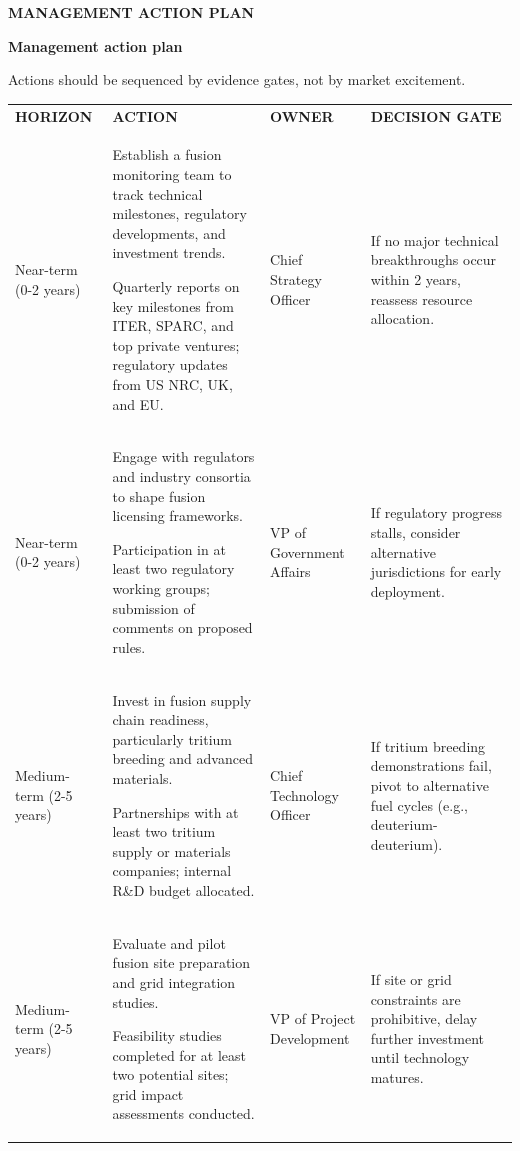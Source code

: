 \documentclass[10pt,a4paper]{article}
\begin{document}
\clearpage
{\textcolor{BOBlue}{\scriptsize\bfseries MANAGEMENT ACTION PLAN}}\par\vspace{-1pt}
{\Large\sffamily\bfseries\color{BONavy} Management action plan}\par\vspace{4pt}
{\small\color{BOMuted} Actions should be sequenced by evidence gates, not by market excitement.}\par\vspace{4pt}
\vspace{2pt}{\color{BOBright}\rule{\linewidth}{1pt}}\vspace{5pt}
\begin{tabularx}{\linewidth}{p{24mm}Yp{25mm}Y}
{\scriptsize\bfseries\color{BOBlue} HORIZON} & {\scriptsize\bfseries\color{BOBlue} ACTION} & {\scriptsize\bfseries\color{BOBlue} OWNER} & {\scriptsize\bfseries\color{BOBlue} DECISION GATE} \\[3pt]
{\scriptsize Near-term (0-2 years)} & {\scriptsize Establish a fusion monitoring team to track technical milestones, regulatory developments, and investment trends.\par\textcolor{BOMuted}{Quarterly reports on key milestones from ITER, SPARC, and top private ventures; regulatory updates from US NRC, UK, and EU.}} & {\scriptsize Chief Strategy Officer} & {\scriptsize If no major technical breakthroughs occur within 2 years, reassess resource allocation.} \\[6pt]
{\scriptsize Near-term (0-2 years)} & {\scriptsize Engage with regulators and industry consortia to shape fusion licensing frameworks.\par\textcolor{BOMuted}{Participation in at least two regulatory working groups; submission of comments on proposed rules.}} & {\scriptsize VP of Government Affairs} & {\scriptsize If regulatory progress stalls, consider alternative jurisdictions for early deployment.} \\[6pt]
{\scriptsize Medium-term (2-5 years)} & {\scriptsize Invest in fusion supply chain readiness, particularly tritium breeding and advanced materials.\par\textcolor{BOMuted}{Partnerships with at least two tritium supply or materials companies; internal R\&D budget allocated.}} & {\scriptsize Chief Technology Officer} & {\scriptsize If tritium breeding demonstrations fail, pivot to alternative fuel cycles (e.g., deuterium-deuterium).} \\[6pt]
{\scriptsize Medium-term (2-5 years)} & {\scriptsize Evaluate and pilot fusion site preparation and grid integration studies.\par\textcolor{BOMuted}{Feasibility studies completed for at least two potential sites; grid impact assessments conducted.}} & {\scriptsize VP of Project Development} & {\scriptsize If site or grid constraints are prohibitive, delay further investment until technology matures.} \\[6pt]

\end{tabularx}
\end{document}
